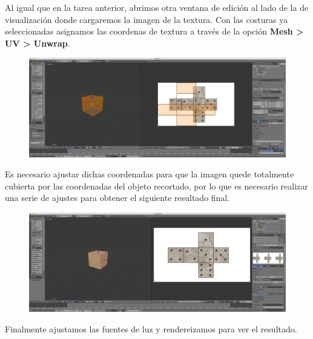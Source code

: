 \documentclass[10pt]{article}
\begin{document}
Al igual que en la tarea anterior, abrimos otra ventana de edición al lado de la de visualización donde cargaremos la imagen de la textura. Con las costuras ya seleccionadas asignamos las coordenas de textura a través de la opción \textbf{Mesh  > UV  > Unwrap}. \\

\begin{figure}[H]
	\begin{center}
	 		\includegraphics[width = 1.00\textwidth]{Imagenes/p3-img10}
	\end{center} 
\end{figure}

Es necesario ajustar dichas coordenadas para que la imagen quede totalmente cubierta por las coordenadas del objeto recortado, por lo que es necesario realizar una serie de ajustes para obtener el siguiente resultado final. \\

\begin{figure}[H]
	\begin{center}
	 		\includegraphics[width = 1.00\textwidth]{Imagenes/p3-img11}
	\end{center} 
\end{figure}

Finalmente ajustamos las fuentes de luz y rendereizamos para ver el resultado. \\
\end{document}
